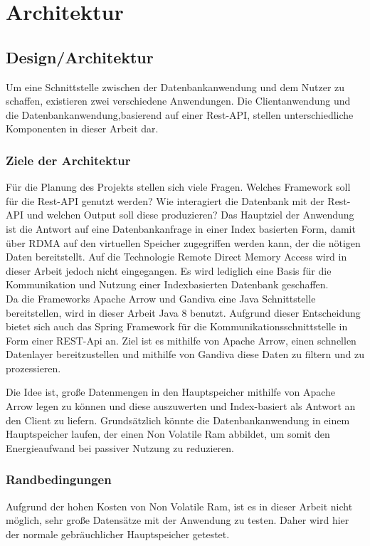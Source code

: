\chapter{Architektur}
\label{Architektur}

\section{Design/Architektur}
Um eine Schnittstelle zwischen der Datenbankanwendung und dem Nutzer zu schaffen, existieren zwei verschiedene Anwendungen. Die Clientanwendung und die Datenbankanwendung,basierend auf einer Rest-API, stellen unterschiedliche Komponenten in dieser Arbeit dar.

\subsection{Ziele der Architektur}

Für die Planung des Projekts stellen sich viele Fragen. Welches Framework soll für die Rest-API genutzt werden? Wie interagiert die Datenbank mit der Rest-API und welchen Output soll diese produzieren?
Das Hauptziel der Anwendung ist die Antwort auf eine Datenbankanfrage in einer Index basierten Form, damit über RDMA auf den virtuellen Speicher zugegriffen werden kann, der die nötigen Daten bereitstellt.
Auf die Technologie Remote Direct Memory Access wird in dieser Arbeit jedoch nicht eingegangen. Es wird lediglich eine Basis für die Kommunikation und Nutzung einer Indexbasierten Datenbank geschaffen.
\\
Da die Frameworks Apache Arrow und Gandiva eine Java Schnittstelle bereitstellen, wird in dieser Arbeit Java 8 benutzt. 
Aufgrund dieser Entscheidung bietet sich auch das Spring Framework für die Kommunikationsschnittstelle in Form einer REST-Api an.
Ziel ist es mithilfe von Apache Arrow, einen schnellen Datenlayer bereitzustellen und mithilfe von Gandiva diese Daten zu filtern und zu prozessieren.

Die Idee ist, große Datenmengen in den Hauptspeicher mithilfe von Apache Arrow  legen zu können und diese auszuwerten und Index-basiert als Antwort an den Client zu liefern. Grundsätzlich könnte die Datenbankanwendung in einem Hauptspeicher laufen, der einen Non Volatile Ram abbildet, um somit den Energieaufwand bei passiver Nutzung zu reduzieren.

\subsection{Randbedingungen}
Aufgrund der hohen Kosten von Non Volatile Ram, ist es in dieser Arbeit nicht möglich, sehr große Datensätze mit der Anwendung zu testen. Daher wird hier der normale gebräuchlicher Hauptspeicher getestet.

